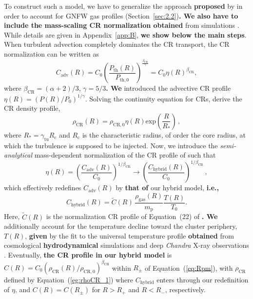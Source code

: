 \documentclass[traditabstract]{aa}
\def\C#1{{\bf #1}}
\newcommand{\rmn}{\mathrm}
\begin{document}
To construct such a model, we have to generalize the approach \C{proposed} by
\citet{2011A&A...527A..99E} in order to account for GNFW gas profiles
(Section~\ref{sec:2.2})\C{. We also have to include the mass-scaling CR normalization
obtained} from simulations \citep{2010MNRAS.409..449P}. While details are given
in Appendix~\ref{app:B}, \C{we show below the main steps}. When turbulent advection
completely dominates the CR transport, the CR normalization can be written as
\citep{2011A&A...527A..99E}
\begin{equation}
C_{\rmn{adv}}(R)=C_{0} \left( \frac{P_{\rmn{th}}(R)}{P_{\rmn{th},0}} \right)^{\frac{\beta_{\rmn{CR}}}{\gamma}} = 
C_{0} \eta(R)^{\beta_{\rmn{CR}}},
\label{eq:Csimple_1}
\end{equation} 
where $\beta_{\rmn{CR}}=(\alpha+2)/3$, $\gamma=5/3$\C{. 
We} introduced the advective CR profile $\eta(R)=(P(R)/P_0)^{1/\gamma}$. 
Solving the continuity equation for CRs, \citet{2011A&A...527A..99E} derive the CR density profile,
\begin{equation}
\rho_{\rmn{CR}}(R) = \rho_{\rmn{CR},0} \eta(R) \rmn{exp} \left( \frac{R}{R_{*}} \right) \, ,
\label{eg:rhoCR_1}
\end{equation} 
where $R_{*}=\gamma_{\rmn{\rmn{tu}}}R_{\rmn{c}}$ and $R_{\rmn{c}}$ is the characteristic 
radius, of order the core radius, at which the turbulence is supposed to be injected.
Now, we introduce the \emph{semi-analytical} mass-dependent normalization of the
CR profile of \cite{2010MNRAS.409..449P} such that
\begin{equation}
\eta(R) = \left( \frac{C_{\rmn{adv}}(R)}{C_0} \right)^{1/\beta_{\rmn{CR}}} \to
\left( \frac{C_{\rmn{hybrid}}(R)}{C_0} \right)^{1/\beta_{\rmn{CR}}} \, ,
\label{eq:eta}
\end{equation} 
which effectively redefines $C_{\rmn{adv}}(R)$ by \C{that of} our hybrid model, \C{i.e.,}
\begin{equation}
C_{\rmn{hybrid}}(R) =  \tilde{C}(R)\, \frac{\rho_{\rmn{gas}}(R)}{m_\rmn{p}} \frac{T(R)}{T_0}.
\label{eq:Cf}
\end{equation} 
Here, $\tilde{C}(R)$ is the normalization CR profile of Equation~(22) of
\cite{2010MNRAS.409..449P}\C{. We} additionally account for the temperature decline toward
the cluster periphery, $T(R)$, \C{given} by the fit to the universal temperature profile
\C{obtained} from cosmological \C{hydrodynamical} simulations
\citep{2007MNRAS.378..385P,2010MNRAS.409..449P} and deep {\em Chandra} X-ray
observations \citep{2005ApJ...628..655V}. Eventually, \C{the CR profile in
our hybrid model} is $C(R)=C_{0}(\rho_{\rmn{CR}}(R)/\rho_{\rmn{CR},0})^{\beta_{\rmn{CR}}}$
within $R_{\pm}$ of Equation~(\ref{eq:Rpm}), with $\rho_{\rmn{CR}}$ defined by 
Equation~(\ref{eg:rhoCR_1}) where $C_{\rmn{hybrid}}$ enters through our redefinition 
of $\eta$, and $C(R) = C(R_{\pm})$ for $R > R_{+}$ and $R < R_{-}$, respectively.
\end{document}
